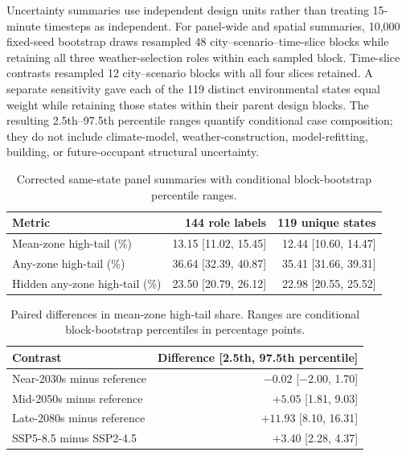 \documentclass[11pt]{article}
\begin{document}
Uncertainty summaries use independent design units rather than treating 15-minute timesteps as independent. For panel-wide and spatial summaries, 10{,}000 fixed-seed bootstrap draws resampled 48 city--scenario--time-slice blocks while retaining all three weather-selection roles within each sampled block. Time-slice contrasts resampled 12 city--scenario blocks with all four slices retained. A separate sensitivity gave each of the 119 distinct environmental states equal weight while retaining those states within their parent design blocks. The resulting 2.5th--97.5th percentile ranges quantify conditional case composition; they do not include climate-model, weather-construction, model-refitting, building, or future-occupant structural uncertainty.

\begin{table}[htbp]
\centering
\caption{Corrected same-state panel summaries with conditional block-bootstrap percentile ranges.}
\label{tab:supp_panel_uncertainty}
\footnotesize
\begin{tabular}{lrr}
\toprule
Metric & 144 role labels & 119 unique states \\
\midrule
Mean-zone high-tail (\%) & 13.15 [11.02, 15.45] & 12.44 [10.60, 14.47] \\
Any-zone high-tail (\%) & 36.64 [32.39, 40.87] & 35.41 [31.66, 39.31] \\
Hidden any-zone high-tail (\%) & 23.50 [20.79, 26.12] & 22.98 [20.55, 25.52] \\
\bottomrule
\end{tabular}
\end{table}

\begin{table}[htbp]
\centering
\caption{Paired differences in mean-zone high-tail share. Ranges are conditional block-bootstrap percentiles in percentage points.}
\label{tab:supp_panel_contrasts}
\footnotesize
\begin{tabular}{lr}
\toprule
Contrast & Difference [2.5th, 97.5th percentile] \\
\midrule
Near-2030s minus reference & $-0.02$ [$-2.00$, 1.70] \\
Mid-2050s minus reference & $+5.05$ [1.81, 9.03] \\
Late-2080s minus reference & $+11.93$ [8.10, 16.31] \\
SSP5-8.5 minus SSP2-4.5 & $+3.40$ [2.28, 4.37] \\
\bottomrule
\end{tabular}
\end{table}
\end{document}

